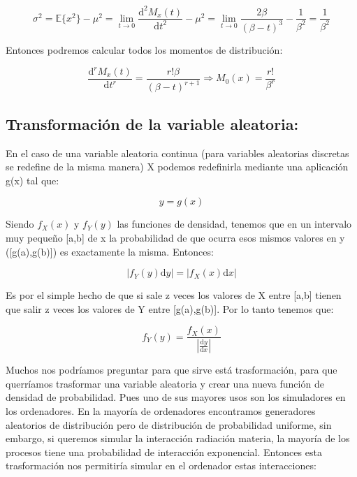 \documentclass[12pt,a4paper]{book}
\newcommand{\D}{\mathrm{d}}
\newcommand{\EE}[1]{ \mathbb{E} \{ #1 \}  }
\begin{document}
$$ \sigma^2 = \EE {x^2} - \mu^2 = \lim_{t \rightarrow 0} \dfrac{\D^2 M_x(t)}{\D t^2} - \mu^2 = \lim_{t \rightarrow 0} \dfrac{2 \beta}{(\beta - t)^3} - \dfrac{1}{\beta^2} = \dfrac{1}{\beta^2}   $$

Entonces podremos calcular todos los momentos de distribución: 

$$ \dfrac{\D^r M_x(t)}{\D t^r} = \dfrac{r! \beta}{(\beta - t)^{r+1}} \Longrightarrow  M_0(x) = \dfrac{r!}{\beta^r} $$

\begin{center}
\end{center}
\subsection{Transformación de la variable aleatoria:}

En el caso de una variable aleatoria continua (para variables aleatorias discretas se redefine de la misma manera) X podemos redefinirla mediante una aplicación g(x) tal que:

$$ y = g(x) $$

Siendo $f_X(x)$ y $f_Y(y)$ las funciones de densidad, tenemos que en un intervalo muy pequeño [a,b] de x la probabilidad de que ocurra esos mismos valores en y ([g(a),g(b)]) es exactamente la misma. Entonces:

$$ | f_Y(y) \D y |  = | f_X (x) \D x | $$

Es por el simple hecho de que si sale z veces los valores de X entre [a,b] tienen que salir z veces los valores de Y entre [g(a),g(b)]. Por lo tanto tenemos que:

\begin{equation}
f_Y(y)= \dfrac{f_X (x)}{|\frac{\D y}{\D x}|}
\end{equation}

Muchos nos podríamos preguntar para que sirve está trasformación, para que querríamos trasformar una variable aleatoria y crear una nueva función de densidad de probabilidad. Pues uno de sus mayores usos son los simuladores en los ordenadores. En la mayoría de ordenadores encontramos generadores aleatorios de distribución pero de distribución de probabilidad uniforme, sin embargo, si queremos simular la interacción radiación materia, la mayoría de los procesos  tiene una probabilidad de interacción exponencial. Entonces esta trasformación nos permitiría simular en el ordenador estas interacciones:
\end{document}

